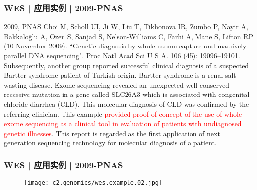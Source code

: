 \begin{frame}
  \frametitle{WES | 应用实例 | 2009-PNAS}
  \footnotesize{
  \begin{block}{2009, PNAS}
  Choi M, Scholl UI, Ji W, Liu T, Tikhonova IR, Zumbo P, Nayir A, Bakkaloğlu A, Ozen S, Sanjad S, Nelson-Williams C, Farhi A, Mane S, Lifton RP (10 November 2009). ``Genetic diagnosis by whole exome capture and massively parallel DNA sequencing". Proc Natl Acad Sci U S A. 106 (45): 19096–19101.\\
  \vspace{1em}
  Subsequently, another group reported successful clinical diagnosis of a suspected Bartter syndrome patient of Turkish origin. Bartter syndrome is a renal salt-wasting disease. Exome sequencing revealed an unexpected well-conserved recessive mutation in a gene called SLC26A3 which is associated with congenital chloride diarrhea (CLD). This molecular diagnosis of CLD was confirmed by the referring clinician. This example \textcolor{red}{provided proof of concept of the use of whole-exome sequencing as a clinical tool in evaluation of patients with undiagnosed genetic illnesses}. This report is regarded as the first application of next generation sequencing technology for molecular diagnosis of a patient.
  \end{block}
}
\end{frame}

\begin{frame}
  \frametitle{WES | 应用实例 | 2009-PNAS}
  \begin{figure}
    \centering
    \texttt{[image: c2.genomics/wes.example.02.jpg]}
  \end{figure}
\end{frame}

